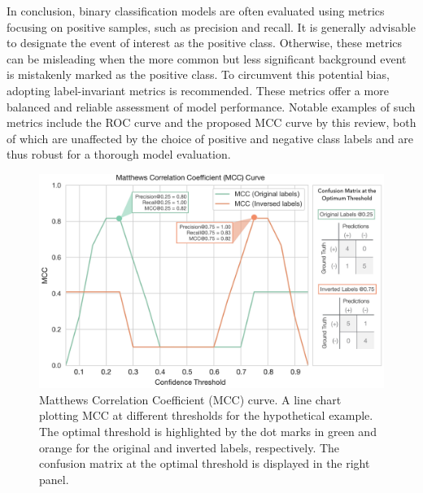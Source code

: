 In conclusion, binary classification models are often evaluated using metrics focusing on positive samples, such as precision and recall. It is generally advisable to designate the event of interest as the positive class. Otherwise, these metrics can be misleading when the more common but less significant background event is mistakenly marked as the positive class. To circumvent this potential bias, adopting label-invariant metrics is recommended. These metrics offer a more balanced and reliable assessment of model performance. Notable examples of such metrics include the ROC curve and the proposed MCC curve by this review, both of which are unaffected by the choice of positive and negative class labels and are thus robust for a thorough model evaluation.
\begin{figure}[h]
    \centering
    \includegraphics[width=.8\textwidth]{fig_s5_mcc.jpg}
    \caption{Matthews Correlation Coefficient (MCC) curve. A line chart plotting MCC at different thresholds for the hypothetical example. The optimal threshold is highlighted by the dot marks in green and orange for the original and inverted labels, respectively. The confusion matrix at the optimal threshold is displayed in the right panel.}
    \label{fig:s5_mcc}
\end{figure}